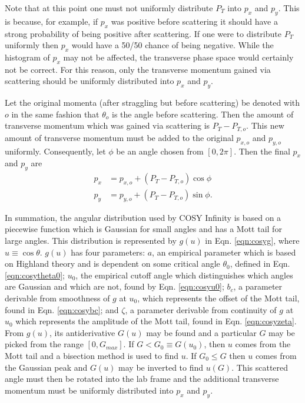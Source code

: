 Note that at this point one must not uniformly distribute $P_T$ into $p_x$ and $p_y$. This is because, for example, if $p_x$ was positive before scattering it should have a strong probability of being positive after scattering. If one were to distribute $P_T$ uniformly then $p_x$ would have a 50/50 chance of being negative. While the histogram of $p_x$ may not be affected, the transverse phase space would certainly not be correct. For this reason, only the transverse momentum gained via scattering should be uniformly distributed into $p_x$ and $p_y$.

Let the original momenta (after straggling but before scattering) be denoted with $o$ in the same fashion that $\theta_o$ is the angle before scattering. Then the amount of transverse momentum which was gained via scattering is $P_T-P_{T,o}$. This new amount of transverse momentum must be added to the original $p_{x,o}$ and $p_{y,o}$ uniformly. Consequently, let $\phi$ be an angle chosen from $[0,2\pi]$. Then the final $p_x$ and $p_y$ are
\begin{align*}
p_x&=p_{x,o}+(P_T-P_{T,o})\cos\phi\\
p_y&=p_{y,o}+(P_T-P_{T,o})\sin\phi.
\end{align*}

In summation, the angular distribution used by COSY Infinity is based on a piecewise function which is Gaussian for small angles \cite{gs} and has a Mott tail for large angles. This distribution is represented by $g(u)$ in Eqn. \ref{eqn:cosyg}, where $u\equiv \cos\theta$. $g(u)$ has four parameters: $a$, an empirical parameter which is based on Highland theory \cite{highland} and is dependent on some critical angle $\theta_0$, defined in Eqn. \ref{eqn:cosytheta0}; $u_0$, the empirical cutoff angle which distinguishes which angles are Gaussian and which are not, found by Eqn. \ref{eqn:cosyu0}; $b_c$, a parameter derivable from smoothness of $g$ at $u_0$, which represents the offset of the Mott tail, found in Eqn. \ref{eqn:cosybc}; and $\zeta$, a parameter derivable from continuity of $g$ at $u_0$ which represents the amplitude of the Mott tail, found in Eqn. \ref{eqn:cosyzeta}. From $g(u)$, its antiderivative $G(u)$ may be found and a particular $G$ may be picked from the range $[0,G_{max}]$. If $G<G_0 \equiv G(u_0)$, then $u$ comes from the Mott tail and a bisection method is used to find $u$. If $G_0 \leq G$ then $u$ comes from the Gaussian peak and $G(u)$ may be inverted to find $u(G)$. This scattered angle must then be rotated into the lab frame and the additional transverse momentum must be uniformly distributed into $p_x$ and $p_y$.

